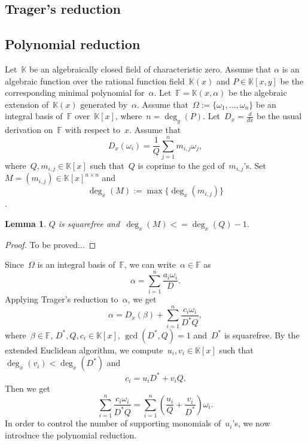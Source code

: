 \documentclass{sig-alternate}
\newtheorem{lemma}[theorem]{Lemma}
\newcommand{\red}{\color{red}}
\newcommand{\bF}{ {\mathbb F}}
\newcommand{\bK}{ {\mathbb K}}
\begin{document}
\subsection{Trager's reduction}\label{SECT:trager}

\subsection{Polynomial reduction} \label{SECT:polyred}
Let~$\bK$ be an algebraically closed field of characteristic zero.
Assume that $\alpha$ is an algebraic function over the rational function
field~$\bK(x)$ and $P\in \bK[x, y]$ be the corresponding minimal polynomial for~$\alpha$.
Let~$\bF = \bK(x, \alpha)$ be the algebraic extension of~$\bK(x)$ generated by~$\alpha$.
Assume that~$\Omega:=\{\omega_1, \ldots, \omega_n\}$ be an integral basis of~$\bF$
over~$\bK[x]$, where~$n=\deg_y(P)$. Let~$D_x=\frac{d}{dx}$ be the usual derivation on~$\bF$
with respect to~$x$. Assume that
\[D_x(\omega_i) = \frac{1}{Q}\sum_{j=1}^n m_{i, j}\omega_j,\]
where~$Q, m_{i, j}\in \bK[x]$ such that~$Q$ is coprime to the gcd of~$m_{i,j}$'s. Set~$M=(m_{i, j})\in \bK[x]^{n\times n}$
and
\[\deg_x(M):= \max\{\deg_x(m_{i, j})\}\].
\begin{lemma}\label{LEM:M}
$Q$ is squarefree and~$\deg_x(M) <= \deg_x(Q)-1$.
\end{lemma}
\begin{proof}{\red To be proved...}
\end{proof}

Since~$\Omega$ is an integral basis of~$\bF$, we can write~$\alpha\in \bF$ as
\[\alpha = \sum_{i=1}^n \frac{a_i\omega_i}{D}.\]
Applying Trager's reduction to~$\alpha$, we get
\[\alpha = D_x(\beta) + \sum_{i=1}^n \frac{c_i\omega_i}{D^*Q},\]
where~$\beta\in \bF$, $D^*, Q, c_i\in \bK[x]$, $\gcd(D^*, Q)=1$ and~$D^*$ is squarefree.
By the extended Euclidean algorithm, we compute~$u_i, v_i\in \bK[x]$ such that
$\deg_x(v_i) < \deg_x(D^*)$ and
\[c_i = u_i D^* + v_i Q.\]
Then we get
\[ \sum_{i=1}^n \frac{c_i\omega_i}{D^*Q} =  \sum_{i=1}^n \left(\frac{u_i}{Q} + \frac{v_i}{D^*}\right)\omega_i.\]
In order to control the number of supporting monomials of~$u_i$'s, we now introduce the polynomial reduction.
\end{document}
